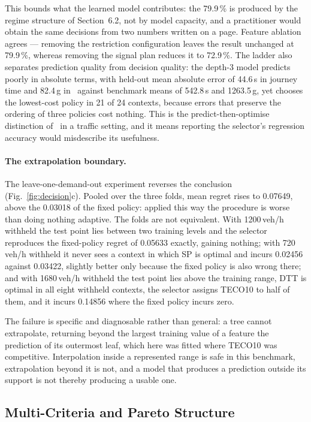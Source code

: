 This bounds what the learned model contributes: the 79.9\,\% is produced by the regime
structure of Section~6.2, not by model capacity, and a practitioner would obtain the same
decisions from two numbers written on a page. Feature ablation agrees --- removing the
restriction configuration leaves the result unchanged at 79.9\,\%, whereas removing the
signal plan reduces it to 72.9\,\%. The ladder also separates prediction quality from
decision quality: the depth-3 model predicts poorly in absolute terms, with held-out mean
absolute error of 44.6\,s in journey time and 82.4\,g in \CO\ against benchmark means of
542.8\,s and 1263.5\,g, yet chooses the lowest-cost policy in 21 of 24 contexts, because
errors that preserve the ordering of three policies cost nothing. This is the
predict-then-optimise distinction of~\cite{elmachtoub2022smart} in a traffic setting, and
it means reporting the selector's regression accuracy would misdescribe its usefulness.

\paragraph{The extrapolation boundary.}
The leave-one-demand-out experiment reverses the conclusion (Fig.~\ref{fig:decision}c).
Pooled over the three folds, mean regret rises to 0.07649, above the 0.03018 of the fixed
policy: applied this way the procedure is worse than doing nothing adaptive. The folds are
not equivalent. With 1200\,veh/h withheld the test point lies between two training levels
and the selector reproduces the fixed-policy regret of 0.05633 exactly, gaining nothing;
with 720\,veh/h withheld it never sees a context in which SP is optimal and incurs 0.02456
against 0.03422, slightly better only because the fixed policy is also wrong there; and
with 1680\,veh/h withheld the test point lies above the training range, DTT is optimal in
all eight withheld contexts, the selector assigns TECO10 to half of them, and it incurs
0.14856 where the fixed policy incurs zero.

The failure is specific and diagnosable rather than general: a tree cannot extrapolate,
returning beyond the largest training value of a feature the prediction of its outermost
leaf, which here was fitted where TECO10 was competitive. Interpolation inside a
represented range is safe in this benchmark, extrapolation beyond it is not, and a model
that produces a prediction outside its support is not thereby producing a usable one.

\subsection{Multi-Criteria and Pareto Structure}
\label{sec:multicriteria}

